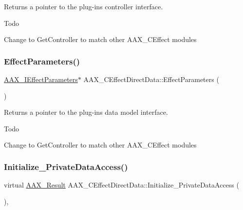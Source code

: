 Returns a pointer to the plug-\/in\textquotesingle{}s controller interface. 

\begin{DoxyRefDesc}{Todo}
\item[\mbox{\hyperlink{a00785__todo000013}{Todo}}]Change to Get\+Controller to match other A\+A\+X\+\_\+\+C\+Effect modules \end{DoxyRefDesc}
\mbox{\label{a01473_a774a00f86f4851001f735f161187b05f}} 
\subsubsection{\texorpdfstring{EffectParameters()}{EffectParameters()}}
{\footnotesize\ttfamily \mbox{\hyperlink{a01825}{A\+A\+X\+\_\+\+I\+Effect\+Parameters}}$\ast$ A\+A\+X\+\_\+\+C\+Effect\+Direct\+Data\+::\+Effect\+Parameters (\begin{DoxyParamCaption}\item[{void}]{ }\end{DoxyParamCaption})}



Returns a pointer to the plug-\/in\textquotesingle{}s data model interface. 

\begin{DoxyRefDesc}{Todo}
\item[\mbox{\hyperlink{a00785__todo000014}{Todo}}]Change to Get\+Controller to match other A\+A\+X\+\_\+\+C\+Effect modules \end{DoxyRefDesc}
\mbox{\label{a01473_ac33b9e51d38ffc375df379018abd5899}} 
\subsubsection{\texorpdfstring{Initialize\_PrivateDataAccess()}{Initialize\_PrivateDataAccess()}}
{\footnotesize\ttfamily virtual \mbox{\hyperlink{a00392_a4d8f69a697df7f70c3a8e9b8ee130d2f}{A\+A\+X\+\_\+\+Result}} A\+A\+X\+\_\+\+C\+Effect\+Direct\+Data\+::\+Initialize\+\_\+\+Private\+Data\+Access (\begin{DoxyParamCaption}{ }\end{DoxyParamCaption})\hspace{0.3cm}{\ttfamily [protected]}, {\ttfamily [virtual]}}



